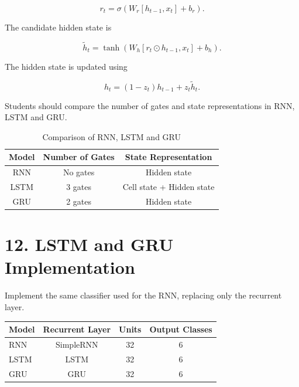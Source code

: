 \documentclass[10pt]{article}
\begin{document}
\[
r_t=\sigma(W_r[h_{t-1},x_t]+b_r).
\]

The candidate hidden state is

\[
\tilde{h}_t=
\tanh(W_h[r_t\odot h_{t-1},x_t]+b_h).
\]

The hidden state is updated using

\[
h_t=(1-z_t)h_{t-1}+z_t\tilde{h}_t.
\]

\begin{center}
\end{center}

Students should compare the number of gates and state representations in
RNN, LSTM and GRU.

\begin{table}[H]
\centering
\caption{Comparison of RNN, LSTM and GRU}
\begin{tabular}{|c|c|c|}
\hline
\textbf{Model} & \textbf{Number of Gates} & \textbf{State Representation} \\ \hline
RNN & No gates & Hidden state \\ \hline
LSTM & 3 gates & Cell state + Hidden state \\ \hline
GRU & 2 gates & Hidden state \\ \hline
\end{tabular}
\end{table}

\section*{12. LSTM and GRU Implementation}

Implement the same classifier used for the RNN, replacing only the recurrent
layer.

\begin{center}
\begin{tabular}{|l|c|c|c|}
\hline
Model & Recurrent Layer & Units & Output Classes\\
\hline
RNN & SimpleRNN & 32 & 6\\
LSTM & LSTM & 32 & 6\\
GRU & GRU & 32 & 6\\
\hline
\end{tabular}
\end{center}
\end{document}
